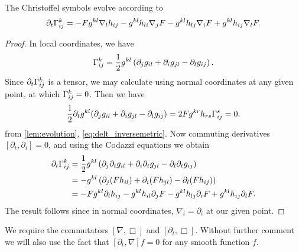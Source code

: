 \documentclass{amsart}
\begin{document}
\begin{lemma}
\label{EvGamma}
The Christoffel symbols evolve according to
\begin{equation}
\partial_t {\Gamma}^{k}_{ij} = -F g^{kl} \nabla_l h_{ij} - g^{kl} h_{li} \nabla_j F - g^{kl} h_{lj} \nabla_i F + g^{kl} h_{ij} \nabla_l F.
\end{equation}
\end{lemma}

\begin{proof}
In local coordinates, we have
\[
\Gamma^{k}_{ij} = \frac{1}{2} g^{kl} \left(\partial_j g_{il} + \partial_i g_{jl} - \partial_l g_{ij}\right).
\]
Since $\partial_t \Gamma^{k}_{ij}$ is a tensor, we may calculate using normal coordinates at any given point, at which \(\Gamma^k_{ij} = 0\). Then we have
\[
\frac{1}{2} \partial_t g^{kl} (\partial_j g_{il} + \partial_i g_{jl} - \partial_l g_{ij}) = 2F g^{kr} h_{rs} \Gamma^s_{ij} = 0.
\]
from \cref{lem:evolution}, \cref{eq:delt_inversemetric}. Now commuting derivatives \([\partial_t, \partial_i] = 0\), and using the Codazzi equations we obtain
\[
\begin{split}
\partial_t {\Gamma}^{k}_{ij} & = \frac{1}{2} g^{kl} \left(\partial_j \partial_t g_{il} + \partial_i \partial_t g_{jl} - \partial_l \partial_t g_{ij}\right) \\
&= - g^{kl} \left(\partial_j (F h_{il}) + \partial_i (F h_{jl}) - \partial_l (F h_{ij})\right) \\
&= -F g^{kl} \partial_l h_{ij} - g^{kl} h_{il} \partial_j F  - g^{kl} h_{lj} \partial_i F + g^{kl} h_{ij} \partial_l F.
\end{split}
\]
The result follows since in normal coordinates, \(\nabla_i = \partial_i\) at our given point. 
\end{proof}

We require the commutators \([\nabla, \Box]\) and \([\partial_t, \Box]\). Without further comment we will also use the fact that \([\partial_t, \nabla] f = 0\) for any smooth function \(f\).
\end{document}
